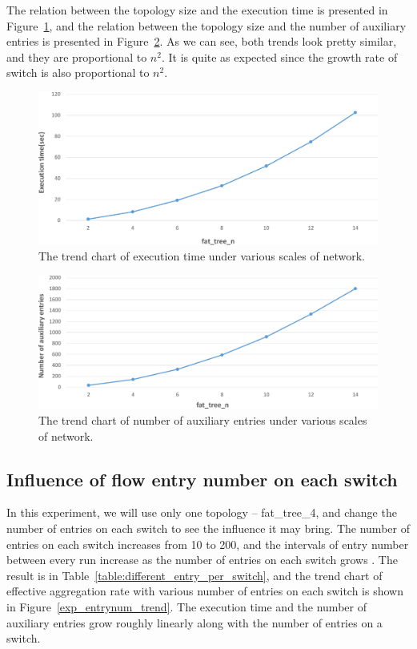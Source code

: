 The relation between the topology size and the execution time is presented in Figure~\ref{different_scale_time_trend}, and the relation between the topology size and the number of auxiliary entries is presented in Figure~\ref{different_scale_aux_trend}. As we can see, both trends look pretty similar, and they are proportional to $n^2$. It is quite as expected since the growth rate of switch is also proportional to $n^2$.

\begin{figure}[H]
\centering 
\includegraphics[width=1\textwidth]{figures/exp_scale_time_trend.pdf}
\caption{The trend chart of execution time under various scales of network.}
\label{different_scale_time_trend}
\end{figure}

\begin{figure}[H]
\centering 
\includegraphics[width=1\textwidth]{figures/exp_scale_aux_trend.pdf}
\caption{The trend chart of number of auxiliary entries under various scales of network.}
\label{different_scale_aux_trend}
\end{figure}

\subsection{Influence of flow entry number on each switch}
In this experiment, we will use only one topology -- fat\_tree\_4, and change the number of entries on each switch to see the influence it may bring. The number of entries on each switch increases from 10 to 200, and the intervals of entry number between every run increase as the number of entries on each switch grows . The result is in Table~\ref{table:different_entry_per_switch}, and the trend chart of effective aggregation rate with various number of entries on each switch is shown in Figure~\ref{exp_entrynum_trend}. The execution time and the number of auxiliary entries grow roughly linearly along with the number of entries on a switch.

